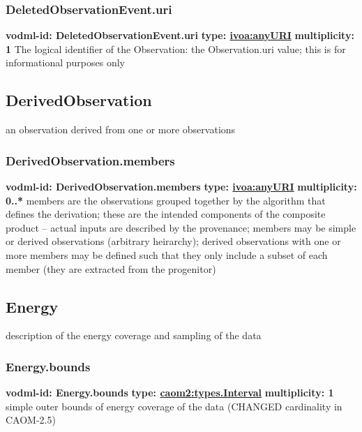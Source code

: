     \subsubsection{DeletedObservationEvent.uri}
      \textbf{vodml-id: DeletedObservationEvent.uri} \newline
      \textbf{type: \hyperref[sect:ivoa]{ivoa:anyURI}} \newline
      \textbf{multiplicity: 1} \newline
      The logical identifier of the Observation: the Observation.uri value; this is for informational purposes only

  \subsection{DerivedObservation}
  \label{sect:DerivedObservation}
    an observation derived from one or more observations

    \subsubsection{DerivedObservation.members}
      \textbf{vodml-id: DerivedObservation.members} \newline
      \textbf{type: \hyperref[sect:ivoa]{ivoa:anyURI}} \newline
      \textbf{multiplicity: 0..*} \newline
      members are the observations grouped together by the algorithm that defines the derivation; these are the intended components of the composite product -- actual inputs are described by the provenance; members may be simple or derived observations (arbitrary heirarchy); derived observations with one or more members may be defined such that they only include a subset of each member (they are extracted from the progenitor)

  \subsection{Energy}
  \label{sect:Energy}
    description of the energy coverage and sampling of the data

    \subsubsection{Energy.bounds}
      \textbf{vodml-id: Energy.bounds} \newline
      \textbf{type: \hyperref[sect:types.Interval]{caom2:types.Interval}} \newline
      \textbf{multiplicity: 1} \newline
      simple outer bounds of energy coverage of the data (CHANGED cardinality in CAOM-2.5)

